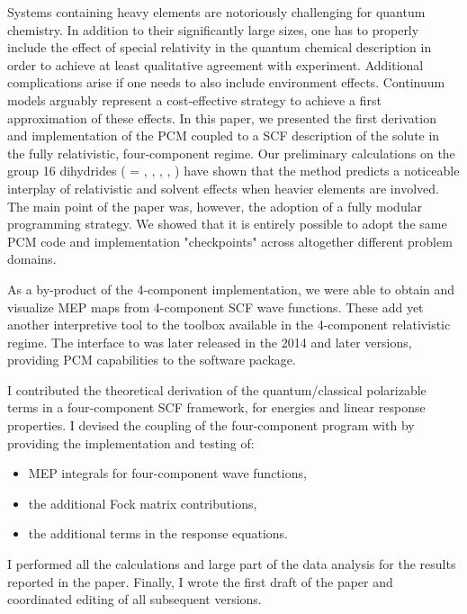 Systems containing heavy elements are notoriously challenging for quantum chemistry.
In addition to their significantly large sizes, one has to properly include the
effect of special relativity in the quantum chemical description in order to
achieve at least qualitative agreement with experiment.
Additional complications arise if one needs to also include environment effects.
Continuum models arguably represent a cost-effective strategy to achieve a first
approximation of these effects.
In this paper, we presented the first derivation and implementation of the \acs{PCM}
coupled to a \acs{SCF} description of the solute in the fully relativistic, four-component
regime.
Our preliminary calculations on the group 16 dihydrides  ( =
, , , , ) have shown that the method predicts
a noticeable interplay of relativistic and solvent effects when heavier
elements are involved.
The main point of the paper was, however, the adoption of a fully modular
programming strategy. We showed that it is entirely possible to adopt the same
\acs{PCM} code and implementation "checkpoints" across altogether different
problem domains.

As a by-product of the 4-component implementation, we were able to obtain and visualize \acs{MEP} maps
from 4-component \acs{SCF} wave functions. These add yet another interpretive tool to the toolbox available
in the 4-component relativistic regime.
The interface to \DIRAC was later released in the 2014 and later versions,
providing \acs{PCM} capabilities to the software package.

I contributed the theoretical derivation of the quantum/classical polarizable
terms in a four-component \acs{SCF} framework, for energies and linear response
properties. I devised the coupling of the four-component program \DIRAC with
\pcmsolver by providing the implementation and testing of:
\begin{itemize}
  \item \acs{MEP} integrals for four-component wave functions,
  \item the additional Fock matrix contributions,
  \item the additional terms in the response equations.
\end{itemize}
I performed all the calculations and large part of the data analysis
for the results reported in the paper.
Finally, I wrote the first draft of the paper and coordinated editing of
all subsequent versions.

